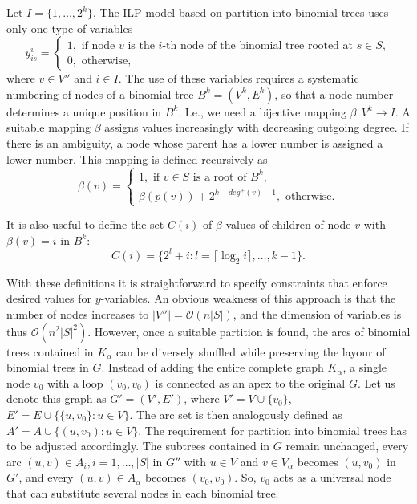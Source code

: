Let $I=\{1,\dots,2^k\}$.
The ILP model based on partition into binomial trees uses only one type of variables
$$
y_{is}^v=\begin{cases}
1, \text{ if  node } v \text{ is the } i\text{-th node of the binomial tree rooted at } s\in S,\\
0, \text{ otherwise},
\end{cases}
$$
where $v\in V''$ and $i\in I $. 
The use of these variables requires a systematic numbering of nodes of a binomial tree $B^k=(V^k,E^k)$, so that a node number determines a unique position in $B^k$.
I.e., we need a bijective mapping $\beta: V^k \to I$.
A suitable mapping $\beta$ assigns values increasingly with decreasing outgoing degree. 
If there is an ambiguity, a node whose parent has a lower number is assigned a lower number.
This mapping is defined recursively as
\begin{equation}
\label{eq:beta}
\beta(v)=\begin{cases}
1,\text{ if } v\in S \text{ is a root of } B^k,\\
\beta(p(v)) + 2^{k-deg^+(v)-1}, \text{ otherwise}.
\end{cases}
\end{equation}

It is also useful to define the set $C(i)$ of $\beta$-values of children of node $v$ with $\beta(v)=i$ in $B^k$:
\begin{equation}
C(i)=\{2^l+i:l=\lceil\log_2 i\rceil,\dots,k-1\}.
\end{equation}

With these definitions it is straightforward to specify constraints that enforce desired values for $y$-variables.
An obvious weakness of this approach is  that the number of nodes increases to $|V''|=\mathcal{O}(n|S|)$, and the dimension of variables is thus $\mathcal{O}(n^2|S|^2)$.
However, once a suitable partition is found, the arcs of binomial trees contained in $K_\alpha$ can be diversely shuffled while preserving the layour of binomial trees in $G$.
Instead of adding the entire complete graph $K_\alpha$, a single node $v_0$ with a loop $(v_0,v_0)$ is connected as an apex to the original $G$.
Let us denote this graph as $G'=(V',E')$, where $V'=V\cup\{v_0\}$, $E'=E\cup\{\{u,v_0\}:u\in V\}$. The arc set is then analogously defined as $A'=A\cup\{(u,v_0): u\in V\}$.
The requirement for partition into binomial trees has to be adjusted accordingly.
The subtrees contained in $G$ remain unchanged, every arc $(u,v)\in A_i, i=1,\dots,|S|$ in $G''$ with $u\in V$ and $v\in V_\alpha$ becomes $(u,v_0)$ in $G'$,
and every $(u,v)\in A_\alpha$ becomes $(v_0,v_0)$.
So, $v_0$ acts as a universal node that can substitute several nodes in each binomial tree.

